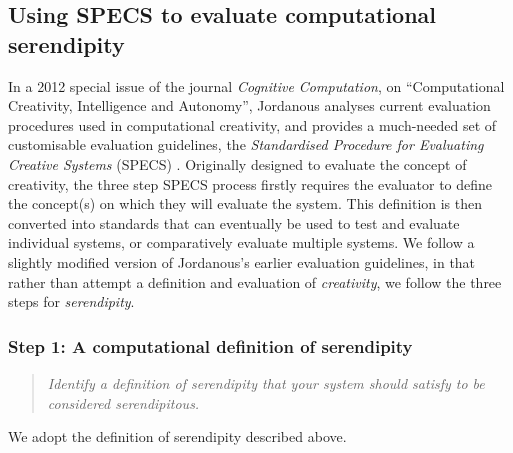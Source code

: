 \subsection{Using SPECS to evaluate computational serendipity}\label{specs-overview}

In a 2012 special issue of the journal {\em Cognitive Computation}, on
``Computational Creativity, Intelligence and Autonomy'', Jordanous
analyses current evaluation procedures used in computational
creativity, and provides a much-needed set of customisable evaluation
guidelines, the \emph{Standardised Procedure for Evaluating Creative
  Systems} (SPECS) \cite{jordanous:12}. Originally designed to evaluate the concept of creativity, the three step SPECS process firstly requires the evaluator to define the concept(s) on which they will evaluate the system. This definition is then converted into standards that can eventually be used to test and evaluate individual systems, or comparatively evaluate multiple systems.
%
We follow a slightly modified version of Jordanous's earlier evaluation
guidelines, in that rather than attempt a definition and evaluation of
{\em creativity}, we follow the three steps for \emph{serendipity}.

\subsubsection*{Step 1: A computational definition of serendipity}
\begin{quote} {\em Identify a definition of serendipity that your
    system should satisfy to be considered serendipitous.}\end{quote}

\noindent We adopt the definition of serendipity described above.

